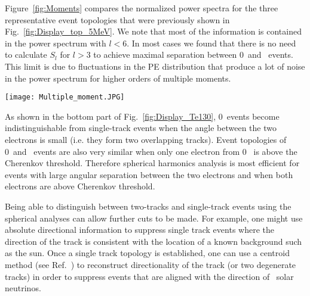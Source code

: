 Figure~\ref{fig:Moments} compares the normalized power spectra for the three representative event topologies that were previously shown in Fig.~\ref{fig:Display_top_5MeV}. We note that most of the information is contained in the power spectrum with $l<$6. In most cases we found that there is no need to calculate $S_l$ for $l>$3 to achieve maximal separation between 0\nbb~and \B~events. This limit is due to fluctuations in the PE distribution that produce a lot of noise in the power spectrum for higher orders of multiple moments.

\begin{figure*}[h]
  \centering
  \texttt{[image: Multiple\_moment.JPG]}
  \caption{Average $S_l$ values for two electrons at 180 degree
    (\emph{color1}) and 90 degree (\emph{color2}) 1.5~MeV each and a
    single electron (\emph{color3}) with the energy of 3~MeV. Error
    bars are RMS values of each corresponding individual $S_l$
    distribution (each consists of 1000 events simulated at the center
    of the detector) indicating typical event-by-event variation.}
\label{fig:Moments}
\end{figure*}


As shown in the bottom part of Fig.~\ref{fig:Display_Te130}, 0\nbb~events become indistinguishable from single-track events when the angle between the two electrons is small (i.e. they form two overlapping tracks). Event topologies of 0\nbb~and \B~events are also very similar when only one electron from 0\nbb~ is above the Cherenkov threshold. Therefore spherical harmonics analysis is most efficient for events with large angular separation between the two electrons and when both electrons are above Cherenkov threshold. 

Being able to distinguish between two-tracks and single-track events using the spherical analyses can allow further cuts to be made.  For example, one might use absolute directional information to suppress single track events where the direction of the track is consistent with the location of a known background such as the sun. Once a single track topology is established, one can use a centroid method (see Ref.~\cite{Directionality}) to reconstruct directionality of the track (or two degenerate tracks) in order to suppress events that are aligned with the direction of \B~solar neutrinos.

